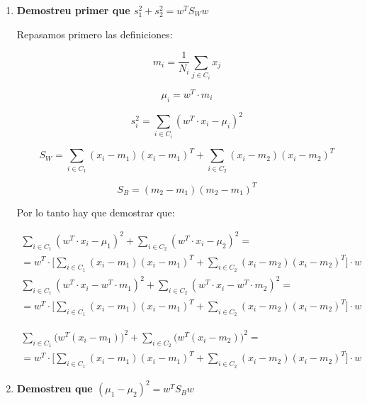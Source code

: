 \documentclass[a4paper,10pt]{article}
\begin{document}
\begin{enumerate}
  \item \textbf{Demostreu primer que $s_1^2 + s_2^2 = w^TS_Ww$}
  
  Repasamos primero las definiciones:
  
\begin{equation*}
m_i = \frac{1}{N_i}\sum_{j \in C_i} x_j
\end{equation*}

\begin{equation*}
\mu_i = w^T \cdot m_i
\end{equation*}

\begin{equation*}
s_i^2 = \sum_{i \in C_i} (w^T \cdot x_i - \mu_i)^2
\end{equation*}

  \begin{equation*}
  S_W = \sum_{i \in C_1} (x_i - m_1)(x_i - m_1)^T + 
  \sum_{i \in C_2} (x_i - m_2)(x_i - m_2)^T
  \end{equation*}
  
  \begin{equation*}
S_B = (m_2 - m_1)(m_2 - m_1)^T
\end{equation*}

Por lo tanto hay que demostrar que:

\begin{multline*}
\sum_{i \in C_1} (w^T \cdot x_i - \mu_1)^2 + 
\sum_{i \in C_2} (w^T \cdot x_i - \mu_2)^2 = \\ =
w^T \cdot \Big[
    \sum_{i \in C_1} (x_i - m_1)(x_i - m_1)^T + 
    \sum_{i \in C_2} (x_i - m_2)(x_i - m_2)^T
\Big] \cdot w
\end{multline*}
\hspace{2cm}
\begin{multline*}
\sum_{i \in C_1} (w^T \cdot x_i - w^T \cdot m_1)^2 + 
\sum_{i \in C_2} (w^T \cdot x_i - w^T \cdot m_2)^2 = \\ =
w^T \cdot \Big[
    \sum_{i \in C_1} (x_i - m_1)(x_i - m_1)^T + 
    \sum_{i \in C_2} (x_i - m_2)(x_i - m_2)^T
\Big] \cdot w
\end{multline*}

\hspace{2cm}
\begin{multline*}
\sum_{i \in C_1} \Big(w^T (x_i - m_1)\Big)^2 + 
\sum_{i \in C_2} \Big(w^T (x_i - m_2)\Big)^2 = \\ =
w^T \cdot \Big[
    \sum_{i \in C_1} (x_i - m_1)(x_i - m_1)^T + 
    \sum_{i \in C_2} (x_i - m_2)(x_i - m_2)^T
\Big] \cdot w
\end{multline*}

  \item \textbf{Demostreu que $(\mu_1 - \mu_2)^2 = w^TS_Bw$}
\end{enumerate}
\end{document}
